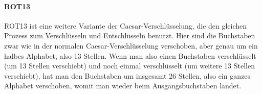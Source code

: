 \paragraph{ROT13}
\label{sec:c-rot13}
ROT13 ist eine weitere Variante der Caesar-Verschlüsselung, die den gleichen Prozess zum Verschlüsseln und Entschlüsseln benutzt.\cite{wikipedia:rot13} Hier sind die Buchstaben zwar wie in der normalen Caesar-Verschlüsselung verschoben, aber genau um ein halbes Alphabet, also 13 Stellen. Wenn man also einen Buchstaben verschlüsselt (um 13 Stellen verschiebt) und noch einmal verschlüsselt (um weitere 13 Stellen verschiebt), hat man den Buchstaben um insgesamt 26 Stellen, also ein ganzes Alphabet verschoben, womit man wieder beim Ausgangsbuchstaben landet.

\begin{table}[h!]
\centering
\caption{Tabula Recta der ROT13-Verschlüsselung}
\label{tab:tabula-recta-rot13}
\end{table}

